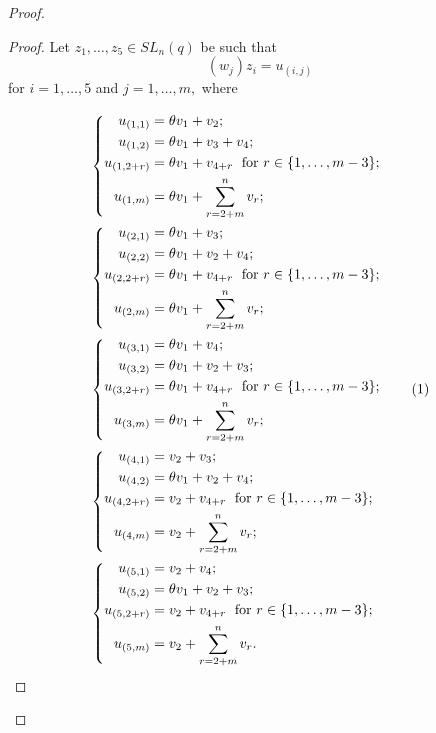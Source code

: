 \begin{proof}
\begin{proof}
  Let $z_1, \ldots, z_5 \in SL_n(q)$ be such that $$(w_{j})z_i=u_{(i,j)}$$ for $i=1, \ldots, 5$ and $j=1, \ldots, m,$ where

\begingroup
\allowdisplaybreaks
\begin{align*}
& \left\{ 
\begin{aligned}
u_{(1,1)} & =\theta v_1+v_2;\\
u_{(1,2)} & =\theta v_1+v_3+v_4;\\
u_{(1,2+r)} & =\theta v_1+v_{4+r}\phantom{;} \text{ for } r \in \{1, \ldots, m-3\};\\
u_{(1,m)} & =\theta v_1 +\sum_{r=2+m}^{n}v_r;
\end{aligned}
\right. \\
& \left\{ 
\begin{aligned}
u_{(2,1)} & =\theta v_1+v_3;\\
u_{(2,2)} & =\theta v_1+v_2+v_4;\\
u_{(2,2+r)} & =\theta v_1+v_{4+r}\phantom{;} \text{ for } r \in \{1, \ldots, m-3\};\\
u_{(2,m)} & =\theta v_1 +\sum_{r=2+m}^{n}v_r;\\
\end{aligned}
\right. \\
& \left\{ 
\begin{aligned}
u_{(3,1)} & =\theta v_1+v_4;\\
u_{(3,2)} & =\theta v_1+v_2+v_3;\\
u_{(3,2+r)} & =\theta v_1+v_{4+r}\phantom{;} \text{ for } r \in \{1, \ldots, m-3\}; \\
u_{(3,m)} & =\theta v_1 +\sum_{r=2+m}^{n}v_r;
\end{aligned}
\right. \stepcounter{equation}\tag{\theequation} \label{orb}  \\
& \left\{ 
\begin{aligned}
u_{(4,1)} & =v_2+v_3;\\
u_{(4,2)} & =\theta v_1+v_2+v_4;\\
u_{(4,2+r)} & =v_2+v_{4+r}\phantom{;} \text{ for } r \in \{1, \ldots, m-3\};\\
u_{(4,m)} & =v_2 +\sum_{r=2+m}^{n}v_r;
\end{aligned}
\right. \\
& \left\{ 
\begin{aligned}
u_{(5,1)} & =v_2+v_4;\\
u_{(5,2)} & =\theta v_1+v_2+v_3;\\
u_{(5,2+r)} & =v_2+v_{4+r}\phantom{;} \text{ for } r \in \{1, \ldots, m-3\};\\
u_{(5,m)} & =v_2 +\sum_{r=2+m}^{n}v_r.
\end{aligned}
\right.  
\end{align*}
\endgroup


\end{proof}
\end{proof}
